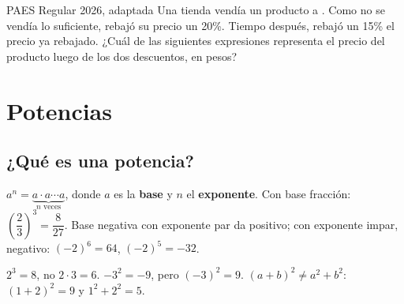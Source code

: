 \begin{elejemplo}{PAES Regular 2026, adaptada}
Una tienda vendía un producto a . Como no se vendía lo suficiente, rebajó su precio un 20\%. Tiempo después, rebajó un 15\% el precio ya rebajado. ¿Cuál de las siguientes expresiones representa el precio del producto luego de los dos descuentos, en pesos?
\end{elejemplo}

\section{Potencias}

\subsection{¿Qué es una potencia?}
$a^n = \underbrace{a\cdot a\cdots a}_{n \text{ veces}}$, donde $a$ es la \textbf{base} y $n$ el \textbf{exponente}. Con base fracción: $\left(\dfrac{2}{3}\right)^3 = \dfrac{8}{27}$. Base negativa con exponente par da positivo; con exponente impar, negativo: $(-2)^6 = 64$, $(-2)^5 = -32$.
\begin{ojo} $2^3 = 8$, no $2\cdot 3 = 6$. \quad $-3^2 = -9$, pero $(-3)^2 = 9$. \quad $(a + b)^2 \neq a^2 + b^2$: $(1 + 2)^2 = 9$ y $1^2 + 2^2 = 5$.\end{ojo}

